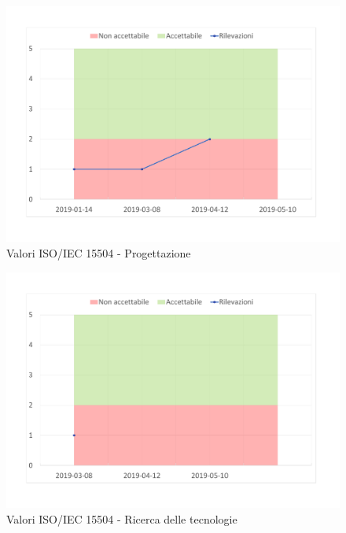 \begin{figure}[H]
	\centering
	\includegraphics[scale=1]{images/resoconto/Progettazione.pdf}
	\caption{Valori ISO/IEC 15504 - Progettazione}	
\end{figure}


\begin{figure}[H]
	\centering
	\includegraphics[scale=1]{images/resoconto/Ricerca.pdf}
	\caption{Valori ISO/IEC 15504 - Ricerca delle tecnologie}	
\end{figure}


